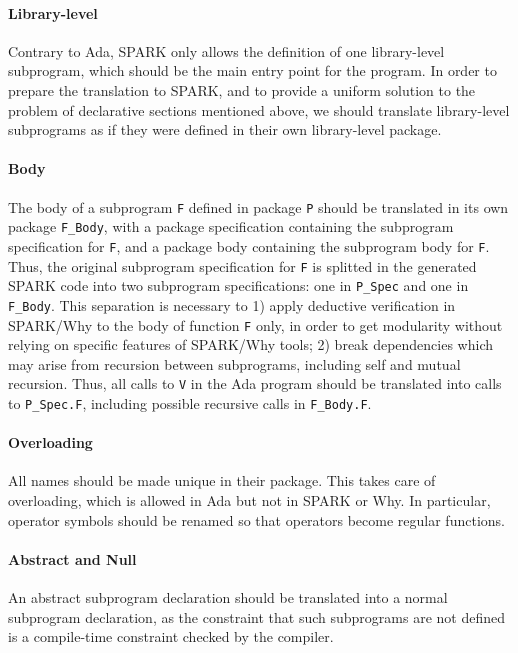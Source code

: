 \documentclass{article}
\begin{document}
\paragraph{Library-level}

Contrary to Ada, SPARK only allows the definition of one library-level
subprogram, which should be the main entry point for the program. In order to
prepare the translation to SPARK, and to provide a uniform solution to the
problem of declarative sections mentioned above, we should translate
library-level subprograms as if they were defined in their own library-level
package.

\paragraph{Body}

The body of a subprogram \verb|F| defined in package \verb|P| should be
translated in its own package \verb|F_Body|, with a package specification
containing the subprogram specification for \verb|F|, and a package body
containing the subprogram body for \verb|F|. Thus, the original subprogram
specification for \verb|F| is splitted in the generated SPARK code into two
subprogram specifications: one in \verb|P_Spec| and one in \verb|F_Body|. This
separation is necessary to 1) apply deductive verification in SPARK/Why to the
body of function \verb|F| only, in order to get modularity without relying on
specific features of SPARK/Why tools; 2) break dependencies which may arise
from recursion between subprograms, including self and mutual recursion.  Thus,
all calls to \verb|V| in the Ada program should be translated into calls to
\verb|P_Spec.F|, including possible recursive calls in \verb|F_Body.F|.

\paragraph{Overloading}

All names should be made unique in their package. This takes care of
overloading, which is allowed in Ada but not in SPARK or Why. In particular,
operator symbols should be renamed so that operators become regular functions.

\paragraph{Abstract and Null}

An abstract subprogram declaration should be translated into a normal
subprogram declaration, as the constraint that such subprograms are not defined
is a compile-time constraint checked by the compiler.
\end{document}
